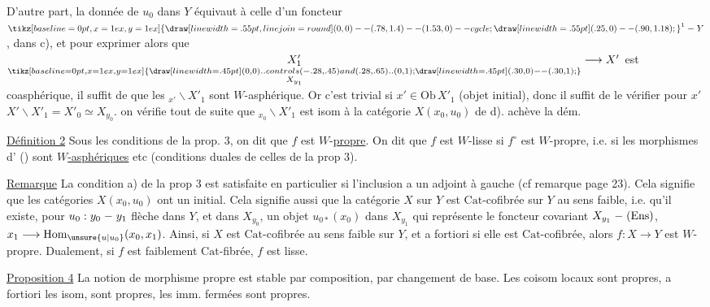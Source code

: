 D'autre part, la donnée de $u_0$ dans $Y$ équivaut à celle d'un foncteur $\mathord{\tikz[baseline=0pt,x=1ex,y=1ex]{\draw[line width=.55pt,line join=round] (0,0)--(.78,1.4)--(1.53,0)--cycle; \draw[line width=.55pt] (.25,0)--(.90,1.18);}}^1\mathrel{\relbar}Y$,  dans c), et pour exprimer alors que $\underset{\substack{\mathord{\tikz[baseline=0pt,x=1ex,y=1ex]{\draw[line width=.45pt] (0,0) .. controls (-.28,.45) and (.28,.65) .. (0,1); \draw[line width=.45pt] (.30,0)--(.30,1);}}\\X_{y_1}}}{X'_1}\longrightarrow X'$ est coasphérique, il suffit de   que les $  {}_{x'}\backslash X'_1$  sont $W$-asphérique. Or c'est trivial si $x'\in\mathrm{Ob}\,X'_1$ (objet initial), donc il suffit de le vérifier pour $x'$ \deleted{$\in$}  $X'\smallsetminus X'_1=X'_0\simeq X_{y_0}$.   on vérifie tout de suite que $  {}_{x_0}\backslash X'_1$ est isom à la catégorie $X(x_0,u_0)$ de d).  achève la dém.


\uline{Définition 2} Sous les conditions de la prop. 3, on dit que $f$ est $W$-\uline{propre}. On dit que $f$ est $W$-lisse si $f^\circ$ est $W$-propre, i.e. si les morphismes d' () sont \uline{$W$-asphériques} etc (conditions duales de celles de la prop 3).

\uline{Remarque} La condition a) de la prop 3 est satisfaite en particulier si l'inclusion \inserted{(*)} a un adjoint à gauche (cf remarque page 23). Cela signifie que les catégories $X(x_0,u_0)$ ont un  initial. Cela signifie aussi que la catégorie $X$ sur $Y$ est $\mathrm{Cat}$-cofibrée sur $Y$ au sens faible, i.e. qu'il existe, pour $u_0:y_0\mathrel{\relbar}y_1$ flèche dans $Y$,  et  dans $X_{y_0}$, un objet $u_{0*}(x_0)$ dans $X_{y_1}$ qui représente le foncteur covariant $X_{y_1}\mathrel{\relbar}(\mathrm{Ens})$, $x_1\longrightarrow\mathrm{Hom}_{\unsure{u|u_0}}(x_0,x_1)$. Ainsi, si $X$ est $\mathrm{Cat}$-cofibrée au sens faible sur $Y$, et a fortiori si elle est $\mathrm{Cat}$-cofibrée, alors $f:X\longrightarrow Y$ est $W$-propre. Dualement, si $f$ est faiblement $\mathrm{Cat}$-fibrée, $f$ est lisse.

 \uline{Proposition 4}  La notion de morphisme propre est stable par composition, par changement de base. Les coisom locaux sont propres,  a fortiori les isom, sont propres, les imm. fermées sont propres.

